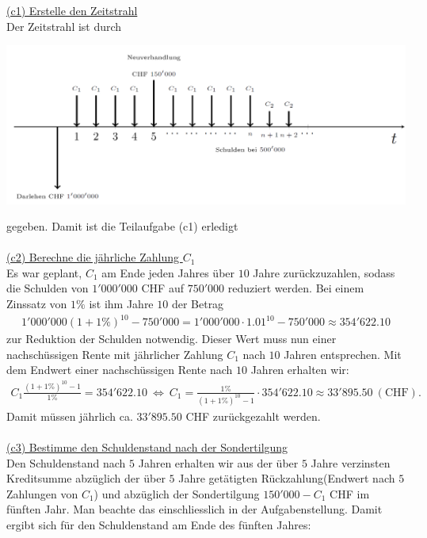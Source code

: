 \newpage
\underline{(c1) Erstelle den Zeitstrahl}\\
Der Zeitstrahl ist durch
\begin{center}
	\includegraphics[scale=0.35]{pictures/zeitstrahl_1_c_filled}
\end{center}
gegeben. Damit ist die Teilaufgabe (c1) erledigt\\
\\
\underline{(c2) Berechne die jährliche Zahlung $ C_1 $}\\
Es war geplant, $ C_1 $ am Ende jeden Jahres über $ 10   $ Jahre zurückzuzahlen, sodass die Schulden von $ 1'000'000 $ CHF auf $ 750'000 $ reduziert werden.
Bei einem Zinssatz von $ 1\% $ ist ihm Jahre $ 10  $ der Betrag
\begin{align*}
	1'000'000(1+ 1 \%)^{10} - 750'000
	=
	1'000'000 \cdot 1.01^{10} -750'000
	\approx
	354'622.10
\end{align*}
zur Reduktion der Schulden notwendig. Dieser Wert muss nun einer nachschüssigen Rente mit jährlicher Zahlung $ C_1 $ nach $ 10 $ Jahren entsprechen.
Mit dem Endwert einer nachschüssigen Rente nach $ 10 $ Jahren erhalten wir:
\begin{align*}
	C_1 \frac{(1+ 1 \%)^{10}  - 1}{1 \%} = 354'622.10
	\
	\Leftrightarrow 
	\
	C_1 = \frac{1 \%}{(1+ 1 \%)^{10}  - 1} \cdot 354'622.10
	\approx 33'895.50 \ \mathrm{(CHF)}.
\end{align*}
Damit müssen jährlich ca. $ 33'895.50 $ CHF zurückgezahlt werden.\\
\\
\underline{(c3) Bestimme den Schuldenstand nach der Sondertilgung}\\
Den Schuldenstand nach $ 5  $ Jahren erhalten wir aus der über $ 5 $ Jahre verzinsten Kreditsumme abzüglich der über $ 5 $ Jahre getätigten Rückzahlung(Endwert nach $ 5 $ Zahlungen von $ C_1 $) und abzüglich 
der Sondertilgung $ 150'000 - C_1 $ CHF im fünften Jahr. Man beachte das einschliesslich in der Aufgabenstellung.
Damit ergibt sich für den Schuldenstand am Ende des fünften Jahres:
